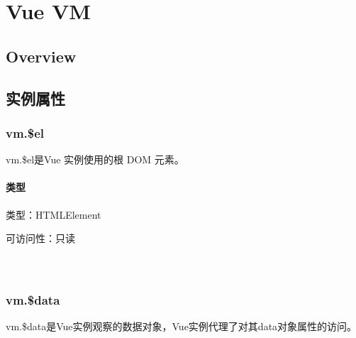\part{Vue VM}


\chapter{Overview}





\chapter{实例属性}


\section{vm.\$el}

vm.\$el是Vue 实例使用的根 DOM 元素。

\subsection{类型}


\begin{compactitem}
\item 类型：HTMLElement
\item 可访问性：只读
\end{compactitem}


\begin{lstlisting}[language=JavaScript]

\end{lstlisting}




\begin{lstlisting}[language=JavaScript]

\end{lstlisting}




\begin{lstlisting}[language=JavaScript]

\end{lstlisting}






\section{vm.\$data}

vm.\$data是Vue实例观察的数据对象，Vue实例代理了对其data对象属性的访问。


